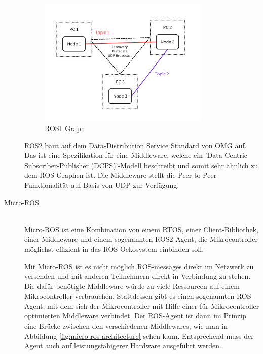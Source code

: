 \begin{flushleft}
\begin{description}
        \begin{figure}[h!]
            \centering
            \includegraphics[width=0.8\textwidth]{imgs/ROS2_concept_graph.png}
            \caption{ROS1 Graph}
            \label{fig:ros2_concept_graph}%
        \end{figure}

        ROS2 baut auf dem Data-Distribution Service Standard von OMG auf. 
        Das ist eine Spezifikation für eine Middleware, welche ein 'Data-Centric Subscriber-Publisher (DCPS)'-Modell beschreibt und somit sehr ähnlich zu dem ROS-Graphen ist. 
        Die Middleware stellt die Peer-to-Peer Funktionalität auf Basis von UDP zur Verfügung.
        \cite{ros} \cite{omg_dds} \cite{ros2_concepts}

        \item[Micro-ROS]\hfill\\
        Micro-ROS ist eine Kombination von einem RTOS, einer Client-Bibliothek, einer Middleware und einem sogenannten ROS2 Agent, 
        die Mikrocontroller möglichst effizient in das ROS-Oekosystem einbinden soll.
        
        Mit Micro-ROS ist es nicht möglich ROS-messages direkt im Netzwerk zu versenden und mit anderen Teilnehmern direkt in Verbindung zu stehen.
        Die dafür benötigte Middleware würde zu viele Ressourcen auf einem Mikrocontroller verbrauchen. 
        Stattdessen gibt es einen sogenannten ROS-Agent, mit dem sich der Mikrocontroller mit Hilfe einer für Mikrocontroller optimierten Middleware verbindet.
        Der ROS-Agent ist dann im Prinzip eine Brücke zwischen den verschiedenen Middlewares, wie man in Abbildung \ref{fig:micro-ros-architecture} sehen kann. Entsprechend muss der Agent auch auf leistungsfähigerer Hardware ausgeführt werden.    
        \cite{micro_ros_concepts}


\end{description}
\end{flushleft}

